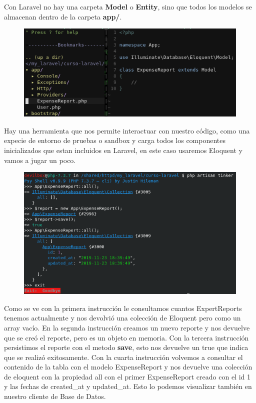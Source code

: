 \documentclass{article}
\begin{document}
Con Laravel no hay una carpeta \textbf{Model} o \textbf{Entity}, sino que todos
los modelos se almacenan dentro de la carpeta \textbf{app/}.

\begin{figure}[h!]
  \centering
  \includegraphics[scale=0.7]{./Pictures/039_model_created_tree.png}
\end{figure}

\newpage

Hay una herramienta que nos permite interactuar con nuestro código, como una
expecie de entorno de pruebas o sandbox y carga todos los componentes
inicializados que estan incluidos en Laravel, en este caso usaremos Eloquent y
vamos a jugar un poco.\\

\begin{figure}[h!]
  \centering
  \includegraphics[scale=0.75]{./Pictures/040_artisan_tinker.png}
\end{figure}

Como se ve con la primera instrucción le consultamos cuantos ExpertReports
tenemos actualmente y nos devolvió una colección de Eloquent pero como un array
vacío. En la segunda instrucción creamos un nuevo reporte y nos devuelve que se
creó el reporte, pero es un objeto en memoria. Con la tercera instrucción
persistimos el reporte con el metodo \textbf{save}, esto nos devuelve un true
que indica que se realizó exitosamente. Con la cuarta instrucción volvemos a
consultar el contenido de la tabla con el modelo ExpenseReport y nos devuelve
una colección de eloquent con la propiedad all con el primer ExpenseReport
creado con el id 1 y las fechas de created\_at y updated\_at. Esto lo podemos
visualizar también en nuestro cliente de Base de Datos.\\
\end{document}
